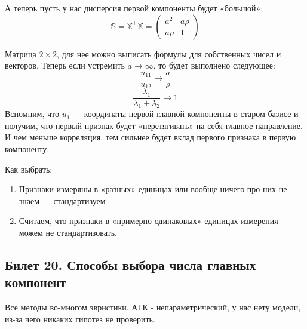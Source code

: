  А теперь пусть у нас дисперсия первой компоненты будет «большой»:
 $$\mathbb{S} = \mathbb{X}^{\intercal} \mathbb{X} = \begin{pmatrix}
a^2 & a\rho \\
a\rho & 1
\end{pmatrix}
$$

Матрица $2\times 2$, для нее можно выписать формулы для собственных чисел и векторов. Теперь если устремить $a \rightarrow \infty$, то  будет выполнено следующее:
$$\frac{u_{11}}{u_{12}} \rightarrow \frac{a}{\rho}$$
$$\frac{\lambda_1}{\lambda_1+\lambda_2} \rightarrow 1$$
Вспомним, что $u_{1}$ — координаты первой главной компоненты в старом базисе и получим, что первый признак будет «перетягивать» на себя главное направление. И чем меньше корреляция, тем сильнее будет вклад первого признака в первую компоненту. 

Как выбрать: 
\begin{enumerate}
\item Признаки измеряны в «разных» единицах или вообще ничего про них не знаем — стандартизуем
\item Считаем, что признаки в «примерно одинаковых» единицах измерения — можем не стандартизовать.
\end{enumerate}

 \subsection{Билет 20. Способы выбора числа главных компонент}
Все методы во-многом эвристики. АГК - непараметрический, у нас нету модели, из-за чего никаких гипотез не проверить.

